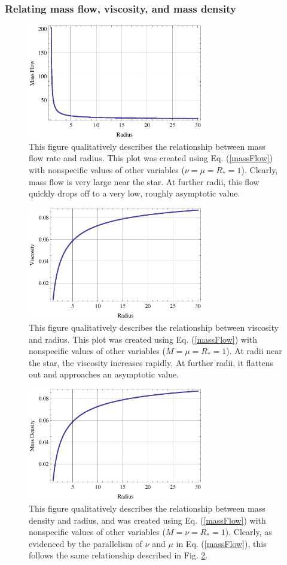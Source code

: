 \documentclass[aps,pra, twocolumn]{revtex4-1}
\begin{document}
\subsubsection{\label{section 2.2.1} Relating mass flow, viscosity, and mass density}
\begin{figure} [b!]
	\includegraphics[width=3in]{massFlow.eps}
	\caption{This figure qualitatively describes the relationship between mass flow rate and radius.  This plot was created using Eq. (\ref{massFlow}) with nonspecific values of other variables ($\nu = \mu = R_* = 1$).  Clearly, mass flow is very large near the star.  At further radii, this flow quickly drops off to a very low, roughly asymptotic value. \label{massFlowFig}}
\end{figure}
\begin{figure} [b!]
	\includegraphics[width=3in]{viscosity.eps}
	\caption{This figure qualitatively describes the relationship between viscosity and radius.  This plot was created using Eq. (\ref{massFlow}) with nonspecific values of other variables ($\dot{M} = \mu = R_* = 1$).  At radii near the star, the viscosity increases rapidly.  At further radii, it flattens out and approaches an asymptotic value. \label{viscosityFig}}
\end{figure}
\begin{figure} [t!]
	\includegraphics[width=3in]{massDensity.eps}
	\caption{This figure qualitatively describes the relationship between mass density and radius, and was created using Eq. (\ref{massFlow}) with nonspecific values of other variables ($\dot{M} = \nu = R_* = 1$).  Clearly, as evidenced by the parallelism of $\nu$ and $\mu$ in Eq. (\ref{massFlow}), this follows the same relationship described in Fig. \ref{viscosityFig}.  \label{massDensityFig}}
\end{figure}
\end{document}
